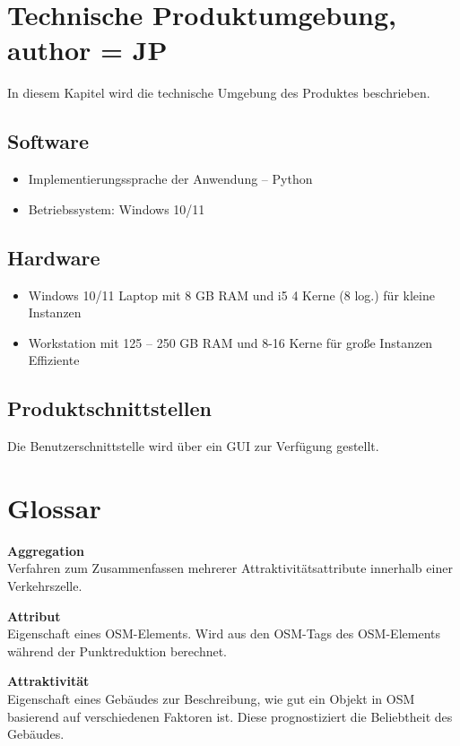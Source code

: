 \documentclass[parskip=full]{scrartcl} %
\begin{document}
\section{Technische Produktumgebung, author = JP}
In diesem Kapitel wird die technische Umgebung des Produktes beschrieben.

\subsection{Software}
\begin{itemize}
    \item Implementierungssprache der Anwendung – Python
    \item Betriebssystem: Windows 10/11
\end{itemize}

\subsection{Hardware}
\begin{itemize}
    \item Windows 10/11 Laptop mit 8 GB RAM und i5 4 Kerne (8 log.) für kleine Instanzen
    \item Workstation mit 125 – 250 GB RAM und 8-16 Kerne für große Instanzen Effiziente
\end{itemize}

\subsection{Produktschnittstellen}
Die Benutzerschnittstelle wird über ein GUI zur Verfügung gestellt.
\newpage





\section{Glossar}

\textbf{Aggregation}\\
Verfahren zum Zusammenfassen mehrerer Attraktivitätsattribute innerhalb einer Verkehrszelle.

\textbf{Attribut}\\
Eigenschaft eines OSM-Elements. Wird aus den OSM-Tags des OSM-Elements während der Punktreduktion berechnet.

\textbf{Attraktivität}\\
Eigenschaft eines Gebäudes zur Beschreibung, wie gut ein Objekt in OSM basierend auf verschiedenen Faktoren ist. Diese prognostiziert die Beliebtheit des Gebäudes.
\end{document}
